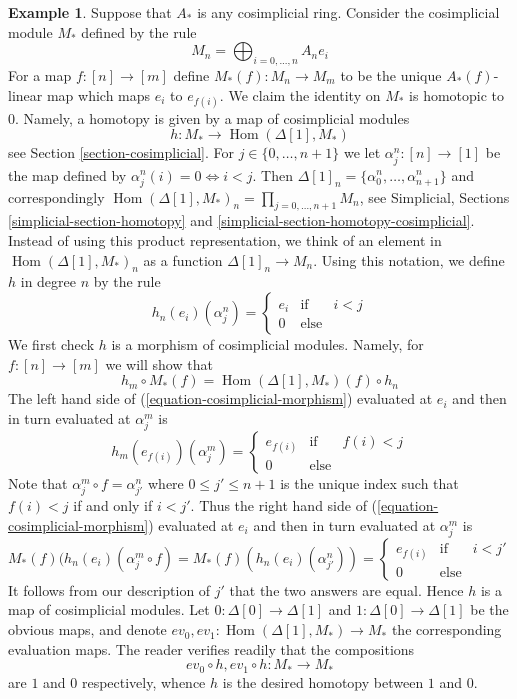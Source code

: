 \documentclass{stacks-project}
\theoremstyle{plain}
\theoremstyle{definition}
\newtheorem{example}[subsection]{Example}
\theoremstyle{remark}
\numberwithin{equation}{subsection}
\def\Hom{\mathop{\mathrm{Hom}}\nolimits}
\begin{document}
\begin{example}
\label{example-cosimplicial-module}
Suppose that $A_*$ is any cosimplicial ring.
Consider the cosimplicial module $M_*$ defined by the rule
$$
M_n = \bigoplus\nolimits_{i = 0, ..., n} A_n e_i
$$
For a map $f : [n] \to [m]$ define $M_*(f) : M_n \to M_m$
to be the unique $A_*(f)$-linear map which maps $e_i$ to $e_{f(i)}$.
We claim the identity on $M_*$ is homotopic to $0$.
Namely, a homotopy is given by a map of cosimplicial modules
$$
h : M_* \longrightarrow \Hom(\Delta[1], M_*)
$$
see Section \ref{section-cosimplicial}.
For $j \in \{0, \ldots, n + 1\}$ we let $\alpha^n_j : [n] \to [1]$ be the map
defined by $\alpha^n_j(i) = 0 \Leftrightarrow i < j$. Then
$\Delta[1]_n = \{\alpha^n_0, \ldots, \alpha^n_{n + 1}\}$ and correspondingly
$\Hom(\Delta[1], M_*)_n = \prod_{j = 0, \ldots, n + 1} M_n$, see
Simplicial, Sections \ref{simplicial-section-homotopy} and
\ref{simplicial-section-homotopy-cosimplicial}. Instead of using
this product representation, we think of an element
in $\Hom(\Delta[1], M_*)_n$ as a function $\Delta[1]_n \to M_n$.
Using this notation, we define $h$ in degree $n$ by the rule
$$
h_n(e_i)(\alpha^n_j) =
\left\{
\begin{matrix}
e_{i} & \text{if} & i < j \\
0 & \text{else} 
\end{matrix}
\right.
$$
We first check $h$ is a morphism of cosimplicial modules. Namely, for
$f : [n] \to [m]$ we will show that
\begin{equation}
\label{equation-cosimplicial-morphism}
h_m \circ M_*(f) = \Hom(\Delta[1], M_*)(f) \circ h_n
\end{equation}
The left hand side of (\ref{equation-cosimplicial-morphism}) evaluated at
$e_i$ and then in turn evaluated at $\alpha^m_j$ is
$$
h_m(e_{f(i)})(\alpha^m_j) =
\left\{
\begin{matrix}
e_{f(i)} & \text{if} & f(i) < j \\
0 & \text{else}
\end{matrix}
\right.
$$
Note that $\alpha^m_j \circ f = \alpha^n_{j'}$ where
$0 \leq j' \leq n + 1$ is the unique index such that $f(i) < j$
if and only if $i < j'$. Thus the right hand side of
(\ref{equation-cosimplicial-morphism}) evaluated at $e_i$
and then in turn evaluated at $\alpha^m_j$ is
$$
M_*(f)(h_n(e_i)(\alpha^m_j \circ f) =
M_*(f)(h_n(e_i)(\alpha^n_{j'})) =
\left\{
\begin{matrix}
e_{f(i)} & \text{if} & i < j' \\
0 & \text{else} 
\end{matrix}
\right.
$$
It follows from our description of $j'$ that the two answers are equal.
Hence $h$ is a map of cosimplicial modules.
Let $0 : \Delta[0] \to \Delta[1]$ and
$1 : \Delta[0] \to \Delta[1]$ be the obvious maps, and denote
$ev_0, ev_1 : \Hom(\Delta[1], M_*) \to M_*$ the corresponding
evaluation maps. The reader verifies readily that
the compositions
$$
ev_0 \circ h, ev_1 \circ h : M_* \longrightarrow M_*
$$
are $1$ and $0$ respectively, whence $h$ is the desired homotopy between
$1$ and $0$.
\end{example}
\end{document}
